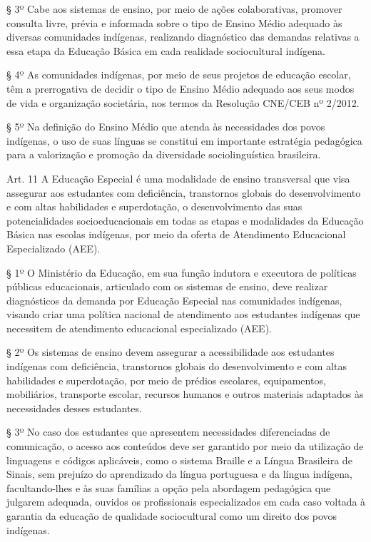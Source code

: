 \documentclass[
]{book}
\begin{document}
§ 3º Cabe aos sistemas de ensino, por meio de ações colaborativas, promover consulta livre, prévia e informada sobre o tipo de Ensino Médio adequado às diversas comunidades indígenas, realizando diagnóstico das demandas relativas a essa etapa da Educação Básica em cada realidade sociocultural indígena.

§ 4º As comunidades indígenas, por meio de seus projetos de educação escolar, têm a prerrogativa de decidir o tipo de Ensino Médio adequado aos seus modos de vida e organização societária, nos termos da Resolução CNE/CEB nº 2/2012.

§ 5º Na definição do Ensino Médio que atenda às necessidades dos povos indígenas, o uso de suas línguas se constitui em importante estratégia pedagógica para a valorização e promoção da diversidade sociolinguística brasileira.

Art. 11 A Educação Especial é uma modalidade de ensino transversal que visa assegurar aos estudantes com deficiência, transtornos globais do desenvolvimento e com altas habilidades e superdotação, o desenvolvimento das suas potencialidades socioeducacionais em todas as etapas e modalidades da Educação Básica nas escolas indígenas, por meio da oferta de Atendimento Educacional Especializado (AEE).

§ 1º O Ministério da Educação, em sua função indutora e executora de políticas públicas educacionais, articulado com os sistemas de ensino, deve realizar diagnósticos da demanda por Educação Especial nas comunidades indígenas, visando criar uma política nacional de atendimento aos estudantes indígenas que necessitem de atendimento educacional especializado (AEE).

§ 2º Os sistemas de ensino devem assegurar a acessibilidade aos estudantes indígenas com deficiência, transtornos globais do desenvolvimento e com altas habilidades e superdotação, por meio de prédios escolares, equipamentos, mobiliários, transporte escolar, recursos humanos e outros materiais adaptados às necessidades desses estudantes.

§ 3º No caso dos estudantes que apresentem necessidades diferenciadas de comunicação, o acesso aos conteúdos deve ser garantido por meio da utilização de linguagens e códigos aplicáveis, como o sistema Braille e a Língua Brasileira de Sinais, sem prejuízo do aprendizado da língua portuguesa e da língua indígena, facultando-lhes e às suas famílias a opção pela abordagem pedagógica que julgarem adequada, ouvidos os profissionais especializados em cada caso voltada à garantia da educação de qualidade sociocultural como um direito dos povos indígenas.
\end{document}
